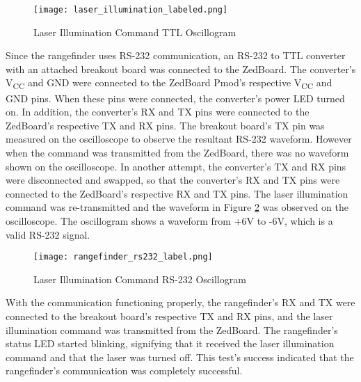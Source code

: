 \begin{figure}[H]
	\centerline{\texttt{[image: laser\_illumination\_labeled.png]}}
	\caption{Laser Illumination Command TTL Oscillogram}
	\label{laser_illumination}
\end{figure}

Since the rangefinder uses RS-232 communication, an RS-232 to TTL converter with an attached breakout board was connected to the ZedBoard. The converter's V\textsubscript{CC} and GND were connected to the ZedBoard Pmod's respective V\textsubscript{CC} and GND pins. When these pins were connected, the converter's power LED turned on. In addition, the converter's RX and TX pins were connected to the ZedBoard's respective TX and RX pins. The breakout board's TX pin was measured on the oscilloscope to observe the resultant RS-232 waveform. However when the command was transmitted from the ZedBoard, there was no waveform shown on the oscilloscope. In another attempt, the converter's TX and RX pins were disconnected and swapped, so that the converter's RX and TX pins were connected to the ZedBoard's respective RX and TX pins. The laser illumination command was re-transmitted and the waveform in Figure \ref{rangefinder_rs232} was observed on the oscilloscope. The oscillogram shows a waveform from +6V to -6V, which is a valid RS-232 signal.

\begin{figure}[H]
	\centerline{\texttt{[image: rangefinder\_rs232\_label.png]}}
	\caption{Laser Illumination Command RS-232 Oscillogram}
	\label{rangefinder_rs232}
\end{figure}

With the communication functioning properly, the rangefinder's RX and TX were connected to the breakout board's respective TX and RX pins, and the laser illumination command was transmitted from the ZedBoard. The rangefinder's status LED started blinking, signifying that it received the laser illumination command and that the laser was turned off. This test's success indicated that the rangefinder's communication was completely successful.

